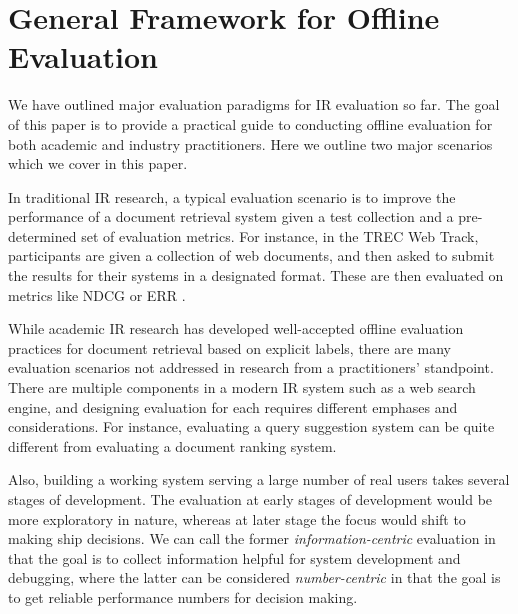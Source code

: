 \section{General Framework for Offline Evaluation}


We have outlined major evaluation paradigms for IR evaluation so far. The goal of this paper is to provide a practical guide to conducting offline evaluation for both academic and industry practitioners. Here we outline two major scenarios which we cover in this paper.

In traditional IR research, a typical evaluation scenario is to improve the performance of a document retrieval system given a test collection and a pre-determined set of evaluation metrics. For instance, in the TREC Web Track, participants are given a collection of web documents, and then asked to submit the results for their systems in a designated format. These are then evaluated on metrics like NDCG \citep{Jarvelin:2002} or ERR \citep{ChapelleMZG09}.

While academic IR research has developed well-accepted offline evaluation practices for document retrieval based on explicit labels, there are many evaluation scenarios not addressed in research from a practitioners' standpoint. There are multiple components in a modern IR system such as a web search engine, and designing evaluation for each requires different emphases and considerations. For instance, evaluating a query suggestion system can be quite different from evaluating a document ranking system. %

Also, building a working system serving a large number of real users takes several stages of development. The evaluation at early stages of development would be more exploratory in nature, whereas at later stage the focus would shift to making ship decisions. We can call the former \textit{information-centric} evaluation in that the goal is to collect information helpful for system development and debugging, where the latter can be considered \textit{number-centric} in that the goal is to get reliable performance numbers for decision making.

